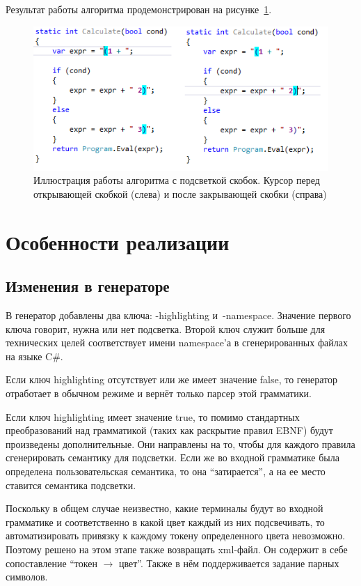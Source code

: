 Результат работы алгоритма продемонстрирован на рисунке~\ref{ex}.

\begin{figure}[t]
    \centering
    \includegraphics[width=\linewidth]{Ivanov/Pictures/demo.png}
    \caption{Иллюстрация работы алгоритма с подсветкой скобок. Курсор перед открывающей скобкой (слева) и после закрывающей скобки (справа)}
    \label{ex}
\end{figure}

\section{Особенности реализации}
\subsection{Изменения в генераторе}

В генератор добавлены два ключа: -highlighting и~-namespace. Значение первого ключа говорит, нужна или нет подсветка. Второй ключ служит больше для технических целей соответствует имени namespace’а в сгенерированных файлах на языке C\#.

Если ключ highlighting отсутствует или же имеет значение false, то генератор отработает в обычном режиме и вернёт только парсер этой грамматики. 

Если ключ highlighting имеет значение true, то помимо стандартных преобразований над грамматикой (таких как раскрытие правил EBNF) будут произведены дополнительные. Они направлены на то, чтобы для каждого правила сгенерировать семантику для подсветки. Если же во входной грамматике была определена пользовательская семантика, то она ``затирается'', а на ее место ставится семантика подсветки. 

Поскольку в общем случае неизвестно, какие терминалы будут во входной грамматике и соответственно в какой цвет каждый из них подсвечивать, то автоматизировать привязку к каждому токену определенного цвета невозможно. Поэтому решено на этом этапе также возвращать xml-файл. Он содержит в себе сопоставление ``токен $\rightarrow$ цвет''. Также в нём поддерживается задание парных символов.

